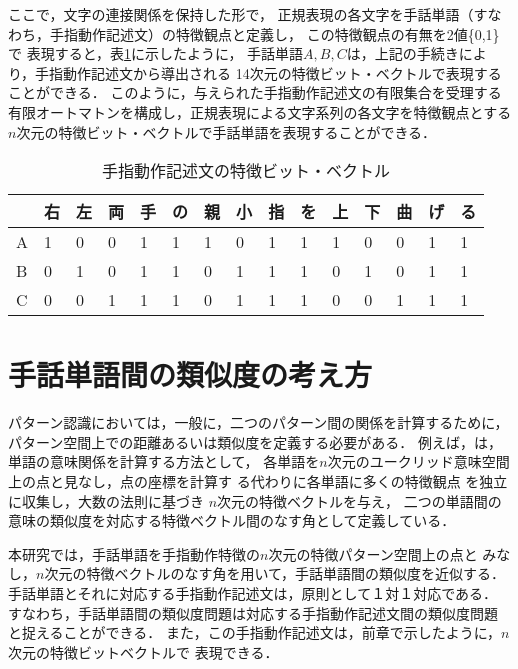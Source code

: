 ここで，文字の連接関係を保持した形で，
正規表現の各文字を手話単語（すなわち，手指動作記述文）の特徴観点と定義し，
この特徴観点の有無を2値\{0,1\}で
表現すると，表\ref{vector}に示したように，
手話単語$A,B,C$は，上記の手続きにより，手指動作記述文から導出される
14次元の特徴ビット・ベクトルで表現することができる．
このように，与えられた手指動作記述文の有限集合を受理する
有限オートマトンを構成し，正規表現による文字系列の各文字を特徴観点とする
$n$次元の特徴ビット・ベクトルで手話単語を表現することができる．

\begin{table}[htbp]
\tabcolsep=3pt\footnotesize
\caption{手指動作記述文の特徴ビット・ベクトル}
\label{vector}
\begin{center}
\begin{tabular}{l|llllllllllllll}\hline
  & 右 & 左 & 両 & 手 & の & 親 & 小 & 指 & を & 上 & 下 & 曲 & げ & る \\
\hline\hline
A & 1  & 0  &  0 & 1  & 1  & 1  & 0  & 1  & 1  & 1  & 0  & 0  & 1  & 1  \\
B & 0  & 1  &  0 & 1  & 1  & 0  & 1  & 1  & 1  & 0  & 1  & 0  & 1  & 1  \\
C & 0  & 0  &  1 & 1  & 1  & 0  & 1  & 1  & 1  & 0  & 0  & 1  & 1  & 1  \\
\hline
\end{tabular}
\end{center}
\end{table}

\section {手話単語間の類似度の考え方}

パターン認識においては，一般に，二つのパターン間の関係を計算するために，
パターン空間上での距離あるいは類似度を定義する必要がある\cite[など]{Iijima1989,Tanaka1990}．
例えば，\cite{MaruyamaHiroshi1989}は，単語の意味関係を計算する方法として，
各単語を$n$次元のユークリッド意味空間上の点と見なし，点の座標を計算す
る代わりに各単語に多くの特徴観点
を独立に収集し，大数の法則に基づき $n$次元の特徴ベクトルを与え，
二つの単語間の意味の類似度を対応する特徴ベクトル間のなす角として定義している．

本研究では，手話単語を手指動作特徴の$n$次元の特徴パターン空間上の点と
みなし，$n$次元の特徴ベクトルのなす角を用いて，手話単語間の類似度を近似する．
手話単語とそれに対応する手指動作記述文は，原則として１対１対応である．
すなわち，{\gt 手話単語間の類似度問題は対応する手指動作記述文間の類似度問題}
と捉えることができる．
また，この手指動作記述文は，前章で示したように，$n$次元の特徴ビットベクトルで
表現できる．

